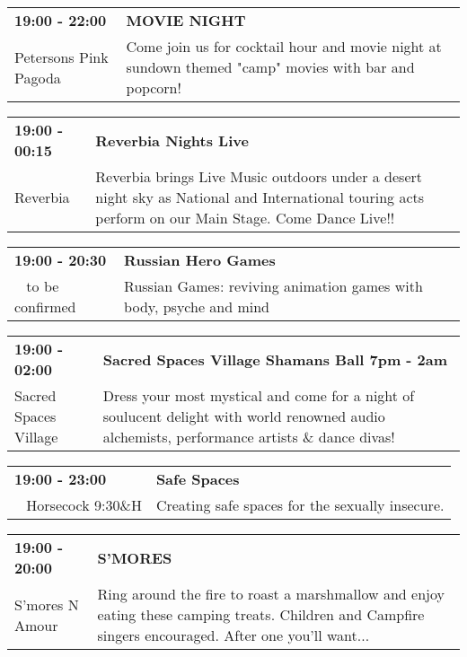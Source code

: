 \begin{tabular}{ p{1in} p{2.2in} }
    \textbf{19:00 - 22:00} & \textbf{MOVIE NIGHT} \\
    Petersons Pink Pagoda \newline   & Come join us for cocktail hour and movie night at sundown themed "camp" movies with bar and popcorn! \\
    \hline 
\end{tabular}
    
\begin{tabular}{ p{1in} p{2.2in} }
    \textbf{19:00 - 00:15} & \textbf{Reverbia Nights Live} \\
    Reverbia \newline  & Reverbia brings Live Music outdoors under a desert night sky as National and International touring acts perform on our Main Stage.  Come Dance Live!! \\
    \hline 
\end{tabular}
    
\begin{tabular}{ p{1in} p{2.2in} }
    \textbf{19:00 - 20:30} & \textbf{Russian Hero Games} \\
    ~ \newline to be confirmed & Russian Games: reviving animation games with body, psyche and mind \\
    \hline 
\end{tabular}
    
\begin{tabular}{ p{1in} p{2.2in} }
    \textbf{19:00 - 02:00} & \textbf{Sacred Spaces Village Shamans Ball 7pm - 2am} \\
    Sacred Spaces Village \newline  & Dress your most mystical and come for a night of soulucent delight with world renowned audio alchemists, performance artists \& dance divas! \\
    \hline 
\end{tabular}
    
\begin{tabular}{ p{1in} p{2.2in} }
    \textbf{19:00 - 23:00} & \textbf{Safe Spaces} \\
    ~ \newline Horsecock 9:30\&H & Creating safe spaces for the sexually insecure. \\
    \hline 
\end{tabular}
    
\begin{tabular}{ p{1in} p{2.2in} }
    \textbf{19:00 - 20:00} & \textbf{S'MORES} \\
    S'mores N Amour \newline  & Ring around the fire to roast a marshmallow and enjoy eating these camping treats. Children and Campfire singers encouraged. After one you'll want... \\
    \hline 
\end{tabular}
    

